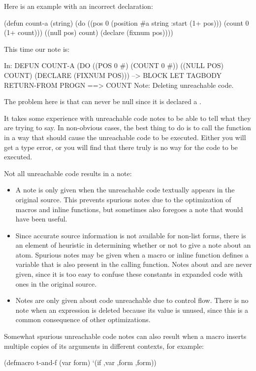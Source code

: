 {Here is an example with an incorrect declaration:
\begin{lisp}
(defun count-a (string)
  (do ((pos 0 (position #\back a string :start (1+ pos)))
       (count 0 (1+ count)))
      ((null pos) count)
    (declare (fixnum pos))))
\end{lisp}
This time our note is:
\begin{example}
In: DEFUN COUNT-A
  (DO ((POS 0 #) (COUNT 0 #))
      ((NULL POS) COUNT)
    (DECLARE (FIXNUM POS)))
--> BLOCK LET TAGBODY RETURN-FROM PROGN 
==>
  COUNT
Note: Deleting unreachable code.
\end{example}
The problem here is that  can never be null since it is declared a
.

It takes some experience with unreachable code notes to be able to tell what
they are trying to say.  In non-obvious cases, the best thing to do is to call
the function in a way that should cause the unreachable code to be executed.
Either you will get a type error, or you will find that there truly is no way
for the code to be executed.

Not all unreachable code results in a note:
\begin{itemize}

\item
A note is only given when the unreachable code textually appears in the
original source.  This prevents spurious notes due to the optimization of
macros and inline functions, but sometimes also foregoes a note that would have
been useful.

\item
Since accurate source information is not available for non-list forms, there is
an element of heuristic in determining whether or not to give a note about an
atom.  Spurious notes may be given when a macro or inline function defines a
variable that is also present in the calling function.  Notes about \false{} and
\true{} are never given, since it is too easy to confuse these constants in
expanded code with ones in the original source.

\item
Notes are only given about code unreachable due to control flow.  There is no
note when an expression is deleted because its value is unused, since this is a
common consequence of other optimizations.
\end{itemize}


Somewhat spurious unreachable code notes can also result when a macro inserts
multiple copies of its arguments in different contexts, for example:
\begin{lisp}
(defmacro t-and-f (var form)
  `(if ,var ,form ,form))


\end{lisp}}

